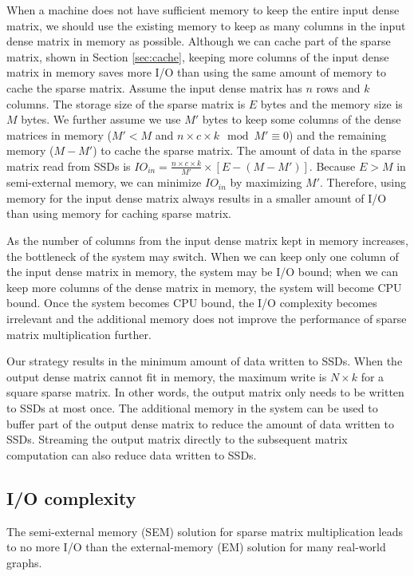 When a machine does not have sufficient memory to keep the entire input dense
matrix, we should use the existing memory to keep as many columns
in the input dense matrix in memory as possible. Although
we can cache part of the sparse matrix, shown in Section \ref{sec:cache},
keeping more columns of the input dense matrix in memory saves more I/O than
using the same amount of memory to cache the sparse matrix. Assume the input
dense matrix has $n$ rows and $k$ columns. The storage size of the sparse
matrix is $E$ bytes and the memory size is $M$ bytes. We further assume
we use $M'$ bytes to keep some columns of the dense matrices in memory
($M' < M$ and ${n \times c \times k} \mod {M'} \equiv 0$)
and the remaining memory ($M - M'$) to cache the sparse matrix.
The amount of data in the sparse matrix read from SSDs is
$IO_{in} = \frac{n \times c \times k}{M'} \times [E - (M - M')]$.
Because $E > M$ in semi-external memory, we can minimize $IO_{in}$ by maximizing $M'$.
Therefore, using memory for the input dense matrix always results in a smaller
amount of I/O than using memory for caching sparse matrix.

As the number of columns from the input dense matrix kept in memory increases,
the bottleneck of the system
may switch. When we can keep only one column of the input dense matrix in memory,
the system may be I/O bound; when we can keep more columns of the dense matrix
in memory, the system will become CPU bound. Once the system becomes CPU bound,
the I/O complexity becomes irrelevant and the additional memory does not improve
the performance of sparse matrix multiplication further.

Our strategy results in the minimum amount of data written to SSDs. When the output
dense matrix cannot fit in memory, the maximum write is $N \times k$ for a square
sparse matrix.
In other words, the output matrix only needs to be written to SSDs at most once.
The additional memory in the system can be used to buffer part of the output
dense matrix to reduce the amount of data written to SSDs. Streaming the output
matrix directly to the subsequent matrix computation can also reduce data written
to SSDs.

\subsection{I/O complexity}
The semi-external memory (SEM) solution for sparse matrix multiplication leads
to no more I/O than the external-memory (EM) solution for many real-world graphs.

